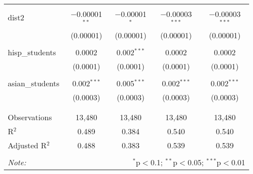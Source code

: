 \begin{table}[!htbp]
\begin{tabular}{@{\extracolsep{-2pt}}lcccc}
  & & & & \\ 
 dist2 & $-$0.00001$^{**}$ & $-$0.00001$^{*}$ & $-$0.00003$^{***}$ & $-$0.00003$^{***}$ \\ 
  & (0.00001) & (0.00001) & (0.00001) & (0.00001) \\ 
  & & & & \\ 
 hisp\_students & 0.0002 & 0.002$^{***}$ & 0.0002 & 0.0002 \\ 
  & (0.0001) & (0.0001) & (0.0001) & (0.0001) \\ 
  & & & & \\ 
 asian\_students & 0.002$^{***}$ & 0.005$^{***}$ & 0.002$^{***}$ & 0.002$^{***}$ \\ 
  & (0.0003) & (0.0003) & (0.0003) & (0.0003) \\ 
  & & & & \\ 
\hline \\[-1.8ex] 
Observations & 13,480 & 13,480 & 13,480 & 13,480 \\ 
R$^{2}$ & 0.489 & 0.384 & 0.540 & 0.540 \\ 
Adjusted R$^{2}$ & 0.488 & 0.383 & 0.539 & 0.539 \\ 
\hline 
\hline \\[-1.8ex] 
\textit{Note:}  & \multicolumn{4}{r}{$^{*}$p$<$0.1; $^{**}$p$<$0.05; $^{***}$p$<$0.01} \\ 
\end{tabular} 
\end{table} 
